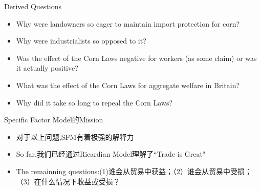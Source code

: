 \documentclass[10pt,hyperref={CJKbookmarks=true},xcolor=dvipsnames,aspectratio=169]{beamer}
\begin{document}
\begin{frame}{Derived Questions }



\begin{itemize}
\item Why were landowners so eager to maintain import protection for corn? 
\item Why were industrialists so opposed to it? 
\item Was the effect of the Corn Laws negative for workers (as some claim)
or was it actually positive? 
\item What was the effect of the Corn Laws for aggregate welfare in Britain? 
\item Why did it take so long to repeal the Corn Laws? 
\end{itemize}
\end{frame}

\begin{frame}{Specific Factor Model的Mission}
	\begin{itemize}
		\item 对于以上问题,SFM有着极强的解释力
		\item So far,我们已经通过Ricardian Model理解了“Trade is Great"
		\item The remainning questions:(1)谁会从贸易中获益；（2）谁会从贸易中受损；（3）在什么情况下收益或受损？
	\end{itemize}

\end{frame}
\end{document}
